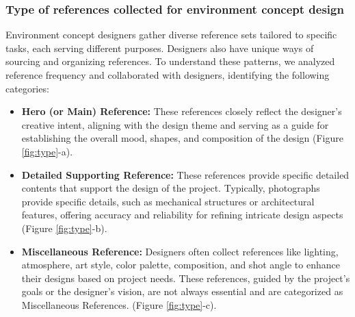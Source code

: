 \subsubsection{Type of references collected for environment concept design}
Environment concept designers gather diverse reference sets tailored to specific tasks, each serving different purposes. Designers also have unique ways of sourcing and organizing references. To understand these patterns, we analyzed reference frequency and collaborated with designers, identifying the following categories:
\begin{itemize}
    \item \textbf{Hero (or Main) Reference:} These references closely reflect the designer’s creative intent, aligning with the design theme and serving as a guide for establishing the overall mood, shapes, and composition of the design (Figure \ref{fig:type}-a). 
    \item \textbf{Detailed Supporting Reference:} These references provide specific detailed contents that support the design of the project. Typically, photographs provide specific details, such as mechanical structures or architectural features, offering accuracy and reliability for refining intricate design aspects  (Figure \ref{fig:type}-b).
    \item \textbf{Miscellaneous Reference:} Designers often collect references like lighting, atmosphere, art style, color palette, composition, and shot angle to enhance their designs based on project needs. These references, guided by the project's goals or the designer's vision, are not always essential and are categorized as Miscellaneous References. (Figure \ref{fig:type}-c).
\end{itemize}

